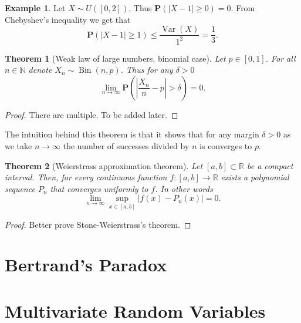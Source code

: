\documentclass[11pt,a4paper]{article}
\theoremstyle{definition}
\newtheorem{example}{Example}[section]
\theoremstyle{plain}
\newtheorem{theorem}{Theorem}[section]
\DeclareMathOperator{\Bin}{Bin}
\DeclareMathOperator{\Var}{Var}
\newcommand{\N}{\mathbb{N}}
\newcommand{\R}{\mathbb{R}}
\newcommand{\abs}[1]{\left\lvert #1\right\rvert}
\begin{document}
  \begin{example}
    Let $X \sim U([0,2])$. Thus $\mathbf P\left(\abs{X - 1} \geq 0\right) = 0$.
    From Chebyshev's inequality we get that
    \[
      \mathbf P\left(\abs{X - 1} \geq 1\right) \le
      \frac{\Var(X)}{1^2} =
      \frac{1}{3}.
    \]
  \end{example}

  \begin{theorem}[Weak law of large numbers, binomial case]
    Let $p \in [0,1]$. For all $n \in \N$ denote $X_n \sim \Bin(n,p)$.
    Thus for any $\delta > 0$
    \[
      \lim_{n \to \infty}
      \mathbf P\left(\abs{\frac{X_n}{n} - p} > \delta\right) =
      0.
    \]
  \end{theorem}
  \begin{proof}
    There are multiple. To be added later.
  \end{proof}

  The intuition behind this theorem is that it shows that for any margin
  $\delta > 0$ as we take $n \to \infty$ the number of successes divided
  by $n$ is converges to $p$.

  \begin{theorem}[Weierstrass approximation theorem]
    Let $[a,b] \subset \R$ be a compact interval. Then, for every continuous
    function $f \colon [a,b] \to \R$ exists a polynomial sequence $P_n$
    that converges uniformly to $f$. In other words
    \[
      \lim_{n \to \infty}
      \sup_{x \in [a,b]}
      \abs{f(x) - P_n(x)} =
      0.
    \]
  \end{theorem}
  \begin{proof}
    Better prove Stone-Weierstrass's theorem.
  \end{proof}

  \newpage

  \section{Bertrand's Paradox}

  \newpage

  \section{Multivariate Random Variables}
\end{document}

